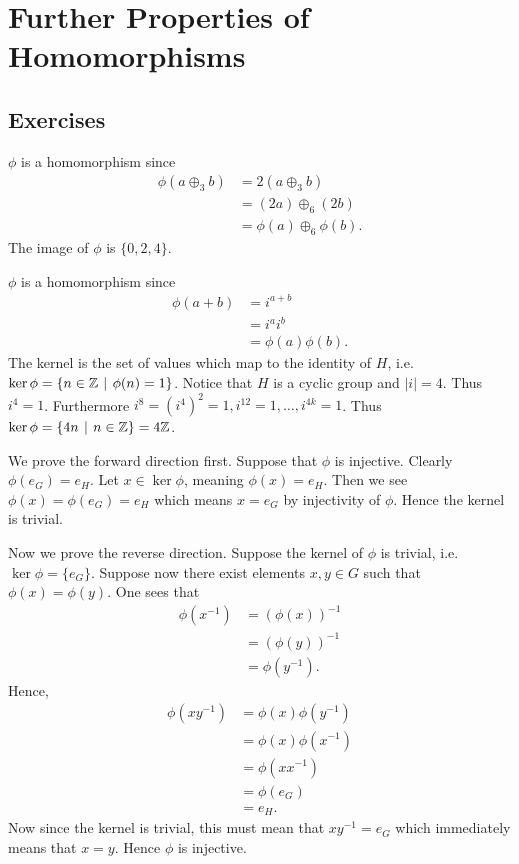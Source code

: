 \section{Further Properties of Homomorphisms}
\subsection*{Exercises}
\begin{questions}
    \item $\phi$ is a homomorphism since
    \begin{align*}
        \phi(a \oplus_3 b) &= 2(a\oplus_3 b)\\
        &= (2a) \oplus_6 (2b)\\
        &= \phi(a) \oplus_6 \phi(b).
    \end{align*}
    The image of $\phi$ is $\{0, 2, 4\}$.

    \item $\phi$ is a homomorphism since
    \begin{align*}
        \phi(a+b) &= i^{a+b}\\
        &=i^ai^b\\
        &=\phi(a)\phi(b).
    \end{align*}
    The kernel is the set of values which map to the identity of $H$, i.e. $\ker\phi = \{n \in \Z \vert \phi(n) = 1\}$. Notice that $H$ is a cyclic group and $|i| = 4$. Thus $i^4 = 1$. Furthermore $i^8 = (i^4)^2 = 1, i^{12} = 1, \dots, i^{4k} = 1$. Thus $\ker\phi = \{4n \vert n \in \Z\} = 4\Z$.

    \item We prove the forward direction first. Suppose that $\phi$ is injective. Clearly $\phi(e_G) = e_H$. Let $x \in \ker\phi$, meaning $\phi(x) = e_H$. Then we see $\phi(x) = \phi(e_G) = e_H$ which means $x = e_G$ by injectivity of $\phi$. Hence the kernel is trivial.

    Now we prove the reverse direction. Suppose the kernel of $\phi$ is trivial, i.e. $\ker \phi = \{e_G\}$. Suppose now there exist elements $x, y \in G$ such that $\phi(x) = \phi(y)$. One sees that
    \begin{align*}
        \phi(x^{-1}) &= \left(\phi(x)\right)^{-1}\\
        &= \left(\phi(y)\right)^{-1}\\
        &= \phi(y^{-1}).
    \end{align*}
    Hence,
    \begin{align*}
        \phi(xy^{-1}) &= \phi(x)\phi(y^{-1})\\
        &= \phi(x)\phi(x^{-1})\\
        &= \phi(xx^{-1})\\
        &= \phi(e_G)\\
        &= e_H.
    \end{align*}
    Now since the kernel is trivial, this must mean that $xy^{-1} = e_G$ which immediately means that $x = y$. Hence $\phi$ is injective.


\end{questions}
